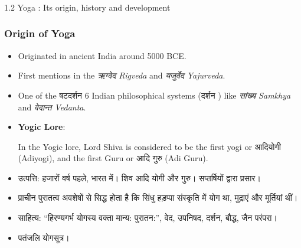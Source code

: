 \begin{frame}[fragile]\frametitle{}
\begin{center}
{\Large 1.2 Yoga : Its origin, history and development}
\end{center}
\end{frame}


\begin{frame}[fragile]\frametitle{Origin of Yoga}

      \begin{itemize}
		\item Originated in ancient India around 5000 BCE.
		\item First mentions in the \textit{ऋग्वेद  Rigveda} and \textit{यजुर्वेद  Yajurveda}.
		\item One of the षटदर्शन  6 Indian philosophical systems (दर्शन ) like \textit{सांख्य  Samkhya} and \textit{वेदान्त  Vedanta}.
          
          
          
          
        \item \textbf{Yogic Lore}: 
          
          In the Yogic lore, Lord Shiva is considered to be the first yogi or आदियोगी (Adiyogi), and the first Guru or आदि गुरु (Adi Guru).
          		
		\item उत्पत्ति: हजारों वर्ष पहले, भारत में। शिव आदि योगी और गुरु। सप्तर्षियों द्वारा प्रसार।
		\item प्राचीन पुरातत्व अवशेषों से सिद्ध होता है कि सिंधु हड़प्पा संस्कृति में योग था, मुद्राएं और मूर्तियां थीं।
		\item साहित्य: “हिरण्यगर्भ योगस्य वक्ता मान्य: पुरातन:”, वेद, उपनिषद, दर्शन, बौद्ध, जैन परंपरा।
		\item  पतंजलि योगसूत्र।
	  \end{itemize}

\end{frame}

